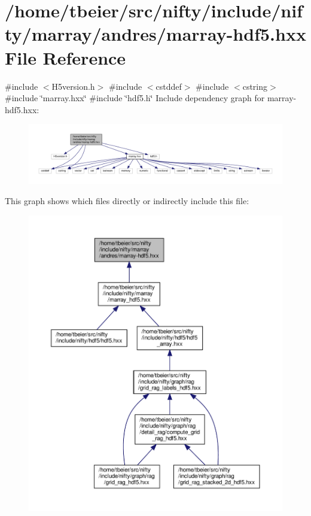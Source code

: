 \hypertarget{marray-hdf5_8hxx}{}\section{/home/tbeier/src/nifty/include/nifty/marray/andres/marray-\/hdf5.hxx File Reference}
\label{marray-hdf5_8hxx}
{\ttfamily \#include $<$H5version.\+h$>$}\newline
{\ttfamily \#include $<$cstddef$>$}\newline
{\ttfamily \#include $<$cstring$>$}\newline
{\ttfamily \#include \char`\"{}marray.\+hxx\char`\"{}}\newline
{\ttfamily \#include \char`\"{}hdf5.\+h\char`\"{}}\newline
Include dependency graph for marray-\/hdf5.hxx\+:
\nopagebreak
\begin{figure}[H]
\begin{center}
\leavevmode
\includegraphics[width=350pt]{marray-hdf5_8hxx__incl}
\end{center}
\end{figure}
This graph shows which files directly or indirectly include this file\+:
\nopagebreak
\begin{figure}[H]
\begin{center}
\leavevmode
\includegraphics[width=350pt]{marray-hdf5_8hxx__dep__incl}
\end{center}
\end{figure}
